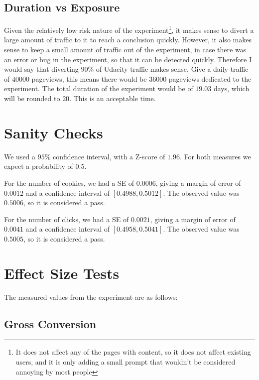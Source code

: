 \documentclass[12pt,a4paper]{article}
\begin{document}
\subsection{Duration vs Exposure}
Given the relatively low risk nature of the experiment\footnote{It does not
affect any of the pages with content, so it does not affect existing users, and
it is only adding a small prompt that wouldn't be considered annoying by most
people}, it makes sense to divert a large amount of traffic to it to reach a
conclusion quickly. However, it also makes sense to keep a small amount of
traffic out of the experiment, in case there was an error or bug in the
experiment, so that it can be detected quickly.  Therefore I would say that
diverting $90$\% of Udacity traffic makes sense. Give a daily traffic of $40000$
pageviews, this means there would be $36000$ pageviews dedicated to the
experiment. The total duration of the experiment would be of $19.03$ days, which
will be rounded to $20$. This is an acceptable time.

\section{Sanity Checks}
We used a $95$\% confidence interval, with a Z-score of $1.96$. For both
measures we expect a probability of $0.5$.

For the number of cookies, we had a SE of $0.0006$, giving a margin of error of
$0.0012$ and a confidence interval of $[ 0.4988, 0.5012 ]$. The observed value
was $0.5006$, so it is considered a pass.

For the number of clicks, we had a SE of $0.0021$, giving a margin of error of
$0.0041$ and a confidence interval of $[ 0.4958, 0.5041 ]$. The observed value
was $0.5005$, so it is considered a pass.

\section{Effect Size Tests}
The measured values from the experiment are as follows:

\subsection{Gross Conversion}
\end{document}
